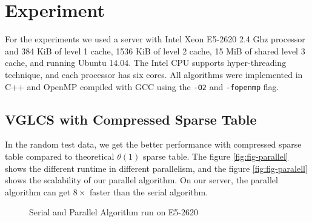 \section{Experiment}
\label{sec:Experiment}

For the experiments we used a server with Intel Xeon E5-2620 2.4 Ghz
processor and 384 KiB of level 1 cache, 1536 KiB of level 2 cache, 15
MiB of shared level 3 cache, and running Ubuntu 14.04.  The Intel CPU
supports hyper-threading technique, and each processor has six cores.
All algorithms were implemented in C++ and OpenMP compiled with GCC
using the {\tt -O2} and {\tt -fopenmp} flag.

\iffalse
我們運行在 Intel Xeon E5-2620 2.40 GHz 主機上，其擁有 L1 cache 384 KiB、L2 cache 1536 KiB 和 L3 cache 15 MiB，
Intel CPU 同時也支持 hyper-threading 技術，每個處理器有 6 個實體核心。
所有的演算法使用 C++ 和 OpenMP 實作，使用優化參數為 \texttt{-O2} 和 \textt{-fopenmp}。
\fi

\subsection{VGLCS with Compressed Sparse Table}

In the random test data, we get the better performance with compressed
sparse table compared to theoretical $\theta(1)$ sparse table.  The
figure \ref{fig:fig-parallel} shows the different runtime in different
parallelism, and the figure \ref{fig:fig-paralell} shows the
scalability of our parallel algorithm.  On our server, the parallel
algorithm can get $8 \times$ faster than the serial algorithm.

\iffalse
我們運行優化策略中的空間壓縮版本，而非理論分析的 $\theta(1)$ 操作，
單次詢問落在 $O(s)$ 中，在實作上由於可以完全壓在暫存器上操作，效能表現較佳。
\fi

\begin{figure}[!thb]
  \centering
  \caption{Serial and Parallel Algorithm run on E5-2620}
\end{figure}


